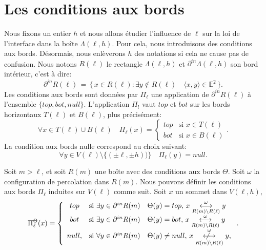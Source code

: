 \documentclass[titlepage,a4paper,12pt]{article}
\newcounter{cor}
\newcommand{\nlongleftrightarrow}{\longleftrightarrow \kern-15pt\not \kern15pt}
\begin{document}
\section{Les conditions aux bords}
Nous fixons un entier $h$ et nous allons étudier l'influence de $\ell$ sur la loi de l'interface dans la boîte $\Lambda(\ell,h)$. Pour cela, nous introduisons des conditions aux bords. Désormais, nous enlèverons $h$ des notations si cela ne cause pas de confusion. Nous notons $R(\ell)$ le rectangle $\Lambda(\ell,h)$ et  $\partial^{in}\Lambda(\ell,h)$ son bord intérieur, c'est à dire:
$$ \partial^{in}R(\ell) \,=\, \big\{ \, x\in R(\ell): \exists y \notin R(\ell) \quad \langle x,y\rangle\in \mathbb{E}^2\, \big\}.
$$
Les conditions aux bords sont données par $\Pi_{\ell}$ une application de $\partial^{in}R(\ell)$ à l'ensemble $\{top,bot,null\}$.
L'application $\Pi_{l}$ vaut $top$ et $bot$ sur les bords horizontaux $T(\ell)$ et $B(\ell)$, plus précisément:
$$ \forall x\in T(\ell)\cup B(\ell) \quad \Pi_{\ell}(x) = \left\lbrace \begin{array}{ll}
top & \text{si }x\in T(\ell)\\
bot & \text{si }x\in B(\ell)
\end{array}
\right..
$$ 
La condition aux bords nulle correspond au choix suivant:
$$\forall y\in V(\ell)\setminus \{(\pm \ell,\pm h))\} \quad \Pi_{\ell}(y) = null.
$$

Soit $m> \ell$, et soit $R(m)$ une boîte avec des conditions aux bords $\Theta$. Soit $\omega$ la configuration de percolation dans $R(m)$. Nous pouvons définir les conditions aux bords $\Pi_{\ell}$ induites sur $V(\ell)$ comme suit. Soit $x$ un sommet dans $V(\ell,h)$, 
$$\Pi^\Theta_{\ell}(x)=\left\lbrace \begin{array}{cl}
top &\text{si } \exists y \in \partial^{in}R(m) \quad \Theta(y) = top,\, x\overset{\omega}{\underset{R(m) \setminus R(\ell)}{\longleftrightarrow}} y\\
bot &\text{si } \exists y \in \partial^{in}R(m)\quad \Theta(y) = bot,\, x\overset{\omega}{\underset{R(m) \setminus R(\ell)}{\longleftrightarrow}} y\\
null, &\text{si } \forall y \in \partial^{in}R(m)\quad \Theta(y) \neq null,\, x\overset{\omega}{\underset{R(m) \setminus R(\ell)}{\nlongleftrightarrow}} y,
\end{array} \right..
$$
\end{document}
